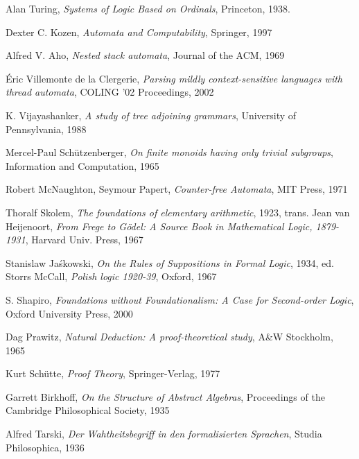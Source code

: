 \documentclass{article}
\begin{document}
\begin{thebibliography}{99}

 Alan Turing, \emph{Systems of Logic Based on
  Ordinals}, Princeton, 1938.

    Dexter C. Kozen,
    \emph{Automata and Computability},
    Springer,
    1997

    Alfred V. Aho,
    \emph{Nested stack automata},
    Journal of the ACM,
    1969

    \'Eric Villemonte de la Clergerie,
    \emph{Parsing mildly context-sensitive languages with thread automata},
    COLING '02 Proceedings,
    2002

    K. Vijayashanker,
    \emph{A study of tree adjoining grammars},
    University of Pennsylvania,
    1988

    Mercel-Paul Sch\"utzenberger,
    \emph{On finite monoids having only trivial subgroups},
    Information and Computation,
    1965

    Robert McNaughton, Seymour Papert,
    \emph{Counter-free Automata},
    MIT Press,
    1971

    Thoralf Skolem,
    \emph{The foundations of elementary arithmetic},
    1923,
    trans. Jean van Heijenoort,
    \emph{From Frege to G\"odel: A Source Book in Mathematical Logic, 1879-1931},
    Harvard Univ. Press,
    1967

    Stanislaw Ja\'skowski,
    \emph{On the Rules of Suppositions in Formal Logic},
    1934,
    ed. Storrs McCall,
    \emph{Polish logic 1920-39},
    Oxford,
    1967

    S. Shapiro,
    \emph{Foundations without Foundationalism: A Case for Second-order
    Logic},
    Oxford University Press,
    2000

    Dag Prawitz,
    \emph{Natural Deduction: A proof-theoretical study},
    A\&W Stockholm,
    1965

    Kurt Sch\"utte,
    \emph{Proof Theory},
    Springer-Verlag,
    1977

    Garrett Birkhoff,
    \emph{On the Structure of Abstract Algebras},
    Proceedings of the Cambridge Philosophical Society,
    1935

    Alfred Tarski,
    \emph{Der Wahtheitsbegriff in den formalisierten Sprachen},
    Studia Philosophica,
    1936


\end{thebibliography}
\end{document}
